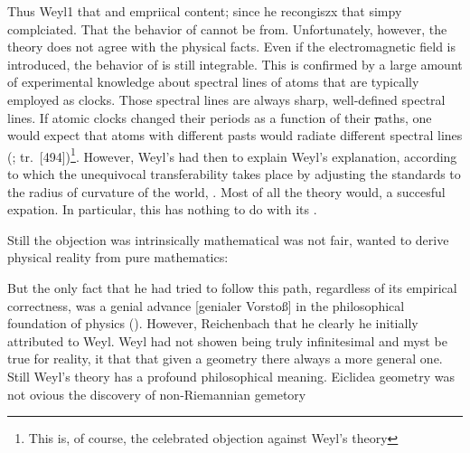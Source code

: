 \documentclass[draft]{article}
\renewcommand{\rzlap}[2]{(\cite[#1]{Reichenbach1928}; tr.\ [#2])\xspace}
\begin{document}
Thus Weyl1 that \rac and empriical content; since he recongiszx that \rac simpy complciated. That the behavior of \rac cannot be from. Unfortunately, however, the theory does not agree with the physical facts. Even if the electromagnetic field is introduced, the behavior of \rac is still integrable. This is confirmed by a large amount of experimental knowledge about spectral lines of atoms that are typically employed as clocks. Those spectral lines are always sharp, well-defined spectral lines. If atomic clocks changed their periods as a function of their \st paths, one would expect that atoms with different pasts would radiate different spectral lines \rzlap{355}{494}\footnote{This is, of course, the celebrated objection against Weyl's theory }. However, Weyl's had then to explain Weyl's explanation, according to which the unequivocal transferability takes place by adjusting the standards to the radius of curvature of the world, . Most of all the theory would, a succesful expation. In particular, this  has nothing to do with its .  

Still the objection was intrinsically mathematical was not fair, wanted to derive physical reality from pure mathematics:


But the only fact that he had tried to follow this path, regardless of its empirical correctness, was a genial advance [genialer Vorstoß] in the philosophical foundation of physics (\citealp[367f.]{Reichenbach1921}). However, Reichenbach that he clearly he initially attributed to Weyl. Weyl had not showen being truly infinitesimal and myst be true \apr for reality, it that that given a geometry there always a more general one. Still Weyl's theory has a profound philosophical meaning. Eiclidea geometry was not ovious the discovery of non-Riemannian gemetory 
\end{document}
